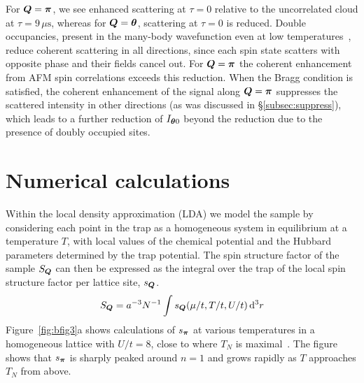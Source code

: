 For $\bm{Q}=\bm{\pi}$, we see enhanced scattering at $\tau=0$ relative to the
uncorrelated cloud at $\tau=9\,\mu\text{s}$, whereas for $\bm{Q}=\bm{\theta}$,
scattering at $\tau=0$ is reduced.  Double occupancies, present in the
many-body wavefunction even at low temperatures~\cite{Fuchs2011}, reduce
coherent scattering in all directions, since each spin state scatters with
opposite phase and their fields cancel out.  For $\bm{Q}=\bm{\pi}$ the coherent
enhancement from  AFM spin correlations exceeds this reduction. When the Bragg
condition is satisfied, the coherent enhancement of the signal along
$\bm{Q}=\bm{\pi}$  suppresses the scattered intensity in other directions (as
was discussed in \S\ref{subsec:suppress}),  which leads to a further reduction
of $I_{\bm{\theta}0}$ beyond the reduction due to the presence of doubly
occupied sites. 


\section{Numerical calculations} 


Within the local density approximation (LDA) we model the sample by considering
each point in the trap as a homogeneous system in equilibrium at a temperature
$T$,  with local values of the chemical potential and the Hubbard parameters
determined by the trap potential.  The spin structure factor of the sample
$S_{\bm{Q}}$ can then be expressed as the integral over the trap of the local
spin structure factor per lattice site, $s_{\bm{Q}}$.  
\begin{equation} 
S_{\bm{Q}} = a^{-3} N^{-1} \int s_{\bm{Q}}( \mu/t,
T/t, U/t) \,\mathrm{d}^{3}r  
\end{equation}
Figure~\ref{fig:bfig3}a shows calculations of $s_{\bm{\pi}}$ at various
temperatures in a homogeneous lattice with $U/t=8$, close to where $T_{N}$ is
maximal~\cite{Staudt2000}.  The figure shows that $s_{\bm{\pi}}$ is sharply
peaked around $n=1$ and grows rapidly as $T$ approaches $T_{N}$ from above. 

